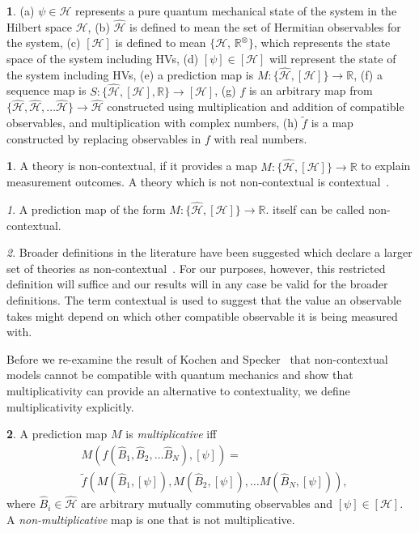 \documentclass[british,aps,prl,superscriptaddress,nofootinbib,times,reprint]{revtex4-1}
\theoremstyle{plain}
\theoremstyle{plain}
\theoremstyle{definition}
\newtheorem{defn}{\protect\definitionname}
\theoremstyle{remark}
\theoremstyle{remark}
\newtheorem{defnrem}{\protect\remarkname}[defn]
\theoremstyle{remark}
\theoremstyle{plain}
\theoremstyle{plain}
\theoremstyle{plain}
\theoremstyle{definition}
\theoremstyle{definition}
\newtheorem*{notn*}{\protect\notationname}
\providecommand{\definitionname}{Definition}
\providecommand{\remarkname}{Remark}
\providecommand{\notationname}{Notation}
\begin{document}
\begin{notn*}
(a) $\psi\in\mathcal{H}$ represents a pure quantum
mechanical state of the system in the Hilbert
space $\mathcal{H}$, (b) $\hat{\mathcal{H}}$ is
defined to mean the set of Hermitian observables
for the system, (c) $[\mathcal{H}]$ is defined to
mean $\{\mathcal{H},\,\mathbb{R}^{\otimes}\}$, which
represents the state  space of the
system including HVs, (d) $[\psi]\in[\mathcal{H}]$
will represent the state of the system including
HVs, (e) a prediction map is $M:\{
\hat{\mathcal{H}},[\mathcal{H}] \}\to\mathbb{R}$,
(f) a sequence map is $S:\{
\hat{\mathcal{H}},[\mathcal{H}],\mathbb{R}
\}\to[\mathcal{H}]$, (g) $f$ is an arbitrary map
from $\{
\hat{\mathcal{H}},\hat{\mathcal{H}},\dots\hat{\mathcal{H}}
\} \to \hat{\mathcal{H}}$ constructed using
multiplication and addition of compatible
observables, and multiplication with complex
numbers, (h) $\tilde{f}$ is a map constructed by
replacing observables in $f$ with real numbers.
\end{notn*}
\begin{defn} A theory is non-contextual, if it
provides a map $M: \{
\hat{\mathcal{H}},[\mathcal{H}] \} \to\mathbb{R}$
to explain measurement outcomes. A theory which is
not non-contextual is contextual~\cite{peresBook}.
\end{defn}
{\color{red}
\begin{defnrem}
A prediction map of the form $M: \{
\hat{\mathcal{H}},[\mathcal{H}] \} \to\mathbb{R}$.
itself can be called  non-contextual.
\end{defnrem}
}
\begin{defnrem}
Broader definitions in the literature have been
suggested which declare a larger set of theories
as non-contextual~\cite{spekkens_pra}. For our
purposes, however, this restricted definition will
suffice  and our results will in any case be valid
for the broader definitions. The term contextual
is used to suggest that the value an observable
takes might depend on which other compatible
observable it is being  measured with.
\end{defnrem}
Before we re-examine the result of Kochen and
Specker~\cite{KochenSpecker} that non-contextual
models cannot be compatible with quantum
mechanics and show that multiplicativity can provide an
alternative to contextuality, we define
multiplicativity explicitly.
\begin{defn}
A prediction map $M$ is \emph{multiplicative} iff
\begin{align*} &
M(f(\hat{B}_{1},\hat{B}_{2},\dots\hat{B}_{N}),[\psi])
= \\ & \tilde
f(M(\hat{B}_{1},[\psi]),M(\hat{B}_{2},[\psi]),\dots
M(\hat{B}_{N},[\psi])), \end{align*}
where $\hat{B}_{i}\in\hat{\mathcal{H}}$ are
arbitrary mutually commuting observables and
$[\psi]\in[\mathcal{H}]$. A
\emph{non-multiplicative} map is one that is not
multiplicative.  
\end{defn} 
\end{document}
